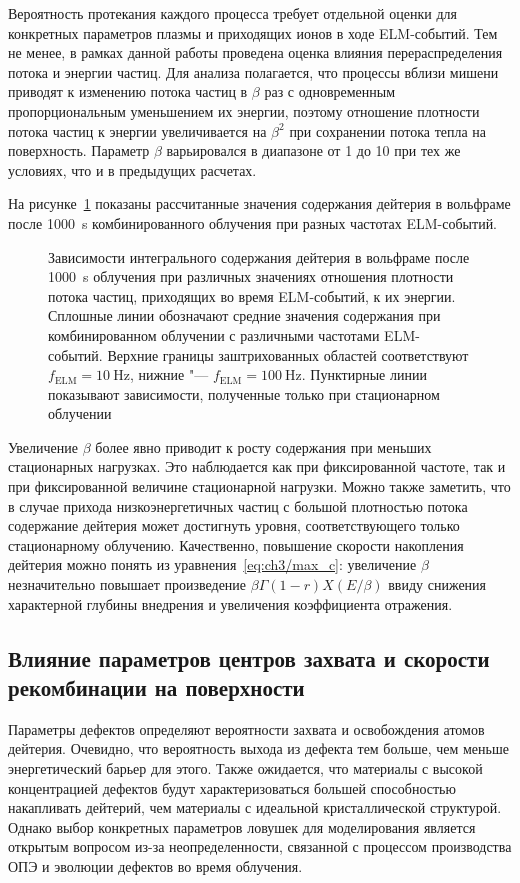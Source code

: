 Вероятность протекания каждого процесса требует отдельной оценки для конкретных параметров плазмы и приходящих ионов в ходе ELM-событий. Тем не менее, в рамках данной работы проведена оценка влияния перераспределения потока и энергии частиц. Для анализа полагается, что процессы вблизи мишени приводят к изменению потока частиц в \( \beta \) раз с одновременным пропорциональным уменьшением их энергии, поэтому отношение плотности потока частиц к энергии увеличивается на $\beta^2$ при сохранении потока тепла на поверхность. Параметр $\beta$ варьировался в диапазоне от 1 до 10 при тех же условиях, что и в предыдущих расчетах. 

На рисунке~\cref{fig:ch3/beta_var} показаны рассчитанные значения содержания дейтерия в вольфраме после \SI{1000}{\second} комбинированного облучения при разных частотах ELM-событий. 
\begin{figure}[ht]
	\caption{Зависимости интегрального содержания дейтерия в вольфраме после \SI{1000}{\second} облучения при различных значениях отношения плотности потока частиц, приходящих во время ELM-событий, к их энергии. Сплошные линии обозначают средние значения содержания при комбинированном облучении с различными частотами ELM-событий. Верхние границы заштрихованных областей соответствуют \(f_\mathrm{ELM} = \SI{10}{\hertz}\), нижние "--- \(f_\mathrm{ELM} = \SI{100}{\hertz}\). Пунктирные линии показывают зависимости, полученные только при стационарном облучении}\label{fig:ch3/beta_var}
\end{figure}
Увеличение $\beta$ более явно приводит к росту содержания при меньших стационарных нагрузках. Это наблюдается как при фиксированной частоте, так и при фиксированной величине стационарной нагрузки. Можно также заметить, что в случае прихода низкоэнергетичных частиц с большой плотностью потока содержание дейтерия может достигнуть уровня, соответствующего только стационарному облучению. Качественно, повышение скорости накопления дейтерия можно понять из уравнения~\cref{eq:ch3/max_c}: увеличение $\beta$ незначительно повышает произведение $\beta\Gamma (1-r) X(E/\beta)$ ввиду снижения характерной глубины внедрения и увеличения коэффициента отражения. 

\subsection{Влияние параметров центров захвата и скорости рекомбинации на поверхности}

Параметры дефектов определяют вероятности захвата и освобождения атомов дейтерия. Очевидно, что вероятность выхода из дефекта тем больше, чем меньше энергетический барьер для этого. Также ожидается, что материалы с высокой концентрацией дефектов будут характеризоваться большей способностью накапливать дейтерий, чем материалы с идеальной кристаллической структурой. Однако выбор конкретных параметров ловушек для моделирования является открытым вопросом из-за неопределенности, связанной с процессом производства ОПЭ и эволюции дефектов во время облучения.

